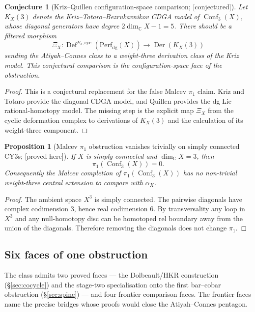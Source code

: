 \documentclass[11pt,reqno]{amsart}
\theoremstyle{plain}
\newtheorem{proposition}[theorem]{Proposition}
\newtheorem{conjecture}[theorem]{Conjecture}
\theoremstyle{definition}
\theoremstyle{remark}
\providecommand{\ClaimStatusProvedHere}{\textnormal{[proved here]}}
\providecommand{\ClaimStatusConjectured}{\textnormal{[conjectured]}}
\DeclareMathOperator{\Conf}{Conf}
\newcommand{\Cbb}{\mathbb{C}}
\begin{document}
\begin{conjecture}[Kriz--Quillen configuration-space comparison; \ClaimStatusConjectured]
\label{thm:malcev-quillen}
Let $K_X(3)$ denote the Kriz--Totaro--Bezrukavnikov CDGA model of
$\Conf_3(X)$, whose diagonal generators have degree
$2\dim_{\Cbb}X-1=5$. There should be a filtered morphism
\[
  \Xi_X:\operatorname{Def}^{E_3,\mathrm{cyc}}
  (\mathrm{Perf}_{\mathrm{dg}}(X))
  \longrightarrow \operatorname{Der}(K_X(3))
\]
sending the Atiyah--Connes class to a weight-three derivation class of
the Kriz model. This conjectural comparison is the configuration-space
face of the obstruction.
\end{conjecture}

\begin{proof}
This is a conjectural replacement for the false Malcev $\pi_1$ claim.
Kriz and Totaro provide the diagonal CDGA model, and Quillen provides
the dg Lie rational-homotopy model. The missing step is the explicit
map $\Xi_X$ from the cyclic deformation complex to derivations of
$K_X(3)$ and the calculation of its weight-three component.
\end{proof}

\begin{proposition}[Malcev $\pi_1$ obstruction vanishes trivially on simply connected CY3s; \ClaimStatusProvedHere]
\label{cor:pi1-motivic}
If $X$ is simply connected and $\dim_{\Cbb}X=3$, then
\[
  \pi_1(\Conf_3(X))=0.
\]
Consequently the Malcev completion of $\pi_1(\Conf_3(X))$ has no
non-trivial weight-three central extension to compare with
$\alpha_X$.
\end{proposition}

\begin{proof}
The ambient space $X^3$ is simply connected. The pairwise diagonals
have complex codimension $3$, hence real codimension $6$. By
transversality any loop in $X^3$ and any null-homotopy disc can be
homotoped rel boundary away from the union of the diagonals. Therefore
removing the diagonals does not change $\pi_1$.
\end{proof}

\subsection{Six faces of one obstruction}
\label{sub:five-faces}
The class admits two proved faces --- the Dolbeault/HKR construction
(\S\ref{sec:cocycle}) and the stage-two specialisation onto the first
bar--cobar obstruction (\S\ref{sec:spine}) --- and four frontier
comparison faces. The frontier faces name the precise bridges whose
proofs would close the Atiyah--Connes pentagon.
\end{document}
